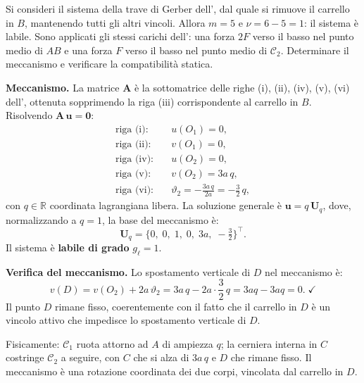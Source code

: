\begin{esempio}
	\label{ex:gerber_labile}
	Si consideri il sistema della trave di Gerber
	dell', dal quale si rimuove il
	carrello in $B$, mantenendo tutti gli altri vincoli.
	Allora $m = 5$ e $\nu = 6 - 5 = 1$: il sistema è
	labile. Sono applicati gli stessi carichi
	dell': una forza $2F$ verso il
	basso nel punto medio di $AB$ e una forza $F$ verso
	il basso nel punto medio di $\mathcal{C}_2$.
	Determinare il meccanismo e verificare la
	compatibilità statica.
	
	\begin{svolgimento}
		
		\noindent\textbf{Meccanismo.}
		La matrice $\bm{A}$ è la sottomatrice delle righe
		(i), (ii), (iv), (v), (vi) dell',
		ottenuta sopprimendo la riga (iii) corrispondente al
		carrello in $B$. Risolvendo $\bm{A}\,\bm{u} = \bm{0}$:
		\begin{align*}
			\text{riga (i):}&\quad u(O_1) = 0,\\
			\text{riga (ii):}&\quad v(O_1) = 0,\\
			\text{riga (iv):}&\quad u(O_2) = 0,\\
			\text{riga (v):}&\quad v(O_2) = 3a\,q,\\
			\text{riga (vi):}&\quad
			\vartheta_2 = -\frac{3a\,q}{2a}
			= -\frac{3}{2}\,q,
		\end{align*}
		con $q \in \mathbb{R}$ coordinata lagrangiana libera.
		La soluzione generale è $\bm{u} = q\,\bm{U}_q$,
		dove, normalizzando a $q = 1$, la base del meccanismo
		è:
		\begin{equation*}
			\bm{U}_q =
			\bigl\{0,\; 0,\; 1,\; 0,\; 3a,\;
			-\tfrac{3}{2}
			\bigr\}^\top.
		\end{equation*}
		Il sistema è \textbf{labile di grado} $g_\ell = 1$.
		
		\noindent\textbf{Verifica del meccanismo.}
		Lo spostamento verticale di $D$ nel meccanismo è:
		\begin{equation*}
			v(D) = v(O_2) + 2a\,\vartheta_2
			= 3a\,q - 2a\cdot\frac{3}{2}\,q
			= 3aq - 3aq = 0. \;\checkmark
		\end{equation*}
		Il punto $D$ rimane fisso, coerentemente con il
		fatto che il carrello in $D$ è un vincolo attivo
		che impedisce lo spostamento verticale di $D$.
		
		Fisicamente: $\mathcal{C}_1$ ruota attorno ad $A$
		di ampiezza $q$; la cerniera interna in $C$
		costringe $\mathcal{C}_2$ a seguire, con $C$ che si
		alza di $3a\,q$ e $D$ che rimane fisso. Il meccanismo
		è una rotazione coordinata dei due corpi, vincolata
		dal carrello in $D$.
		

\end{svolgimento}
\end{esempio}

